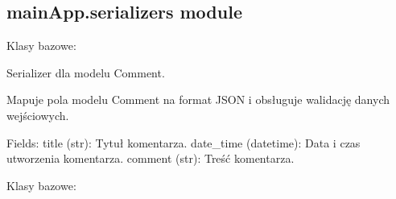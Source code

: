 \documentclass[letterpaper,11pt,polish]{sphinxmanual}
\begin{document}
\subsection{mainApp.serializers module}
\label{\detokenize{mainApp:module-mainApp.serializers}}\label{\detokenize{mainApp:mainapp-serializers-module}}

\begin{fulllineitems}
\label{\detokenize{mainApp:mainApp.serializers.CommentSerializer}}
\pysigstartsignatures
{}
\pysigstopsignatures
\sphinxAtStartPar
Klasy bazowe: 

\sphinxAtStartPar
Serializer dla modelu Comment.

\sphinxAtStartPar
Mapuje pola modelu Comment na format JSON i obsługuje walidację danych wejściowych.

\sphinxAtStartPar
Fields:
\sphinxhyphen{} title (str): Tytuł komentarza.
\sphinxhyphen{} date\_time (datetime): Data i czas utworzenia komentarza.
\sphinxhyphen{} comment (str): Treść komentarza.

\begin{fulllineitems}
\label{\detokenize{mainApp:mainApp.serializers.CommentSerializer.Meta}}
\pysigstartsignatures
{}
\pysigstopsignatures
\sphinxAtStartPar
Klasy bazowe: 

\begin{fulllineitems}
\label{\detokenize{mainApp:mainApp.serializers.CommentSerializer.Meta.fields}}
\pysigstartsignatures
{}
\pysigstopsignatures
\end{fulllineitems}


\end{fulllineitems}
\end{fulllineitems}
\end{document}
